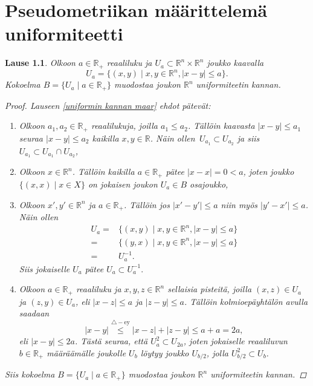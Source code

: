 \documentclass[12pt,a4paper,leqno]{report}
\newcommand{\R}{\mathbb{R}}
\theoremstyle{plain}
\newtheorem{lause}[equation]{Lause}
\theoremstyle{definition}
\theoremstyle{remark}
\begin{document}
\chapter{Pseudometriikan määrittelemä uniformiteetti}\label{luku_pseudo_uniformi}
\begin{lause}
Olkoon $a\in\R_+$ reaaliluku ja $U_a\subset \R^n\times\R^n$ joukko kaavalla
$$U_a=\{ (x,y)\mid x,y\in\R^n,|x-y|\leq a\}.$$
Kokoelma $B=\{U_a\mid a\in\R_+\}$ muodostaa joukon $\R^n$ uniformiteetin kannan.
\begin{proof}
Lauseen \ref{uniformin kannan maar} ehdot pätevät:
\begin{enumerate} [label=(B\arabic*)]
\item %
Olkoon $a_1,a_2\in\R_+$ reaalilukuja, joilla $a_1\leq a_2$. Tällöin kaavasta $|x-y|\leq a_1$ seuraa $|x-y|\leq a_2$ kaikilla $x,y\in\R$. Näin ollen $\, U_{a_1}\subset U_{a_2}$ ja siis $U_{a_1}\subset U_{a_1}\cap U_{a_2}$,
\item%
Olkoon $x\in\R^n$. Tällöin kaikilla $a\in\R_+$ pätee $|x-x|=0< a$, joten joukko $\{(x,x)\mid x\in X\}$ on jokaisen joukon $U_a\in B$ osajoukko,
\item%
Olkoon $x',y'\in\R^n$ ja $a\in\R_+$. Tällöin jos $|x'-y'|\leq a$ niin myös $|y'-x'|\leq a$. Näin ollen 
\begin{align*}
U_a=&\{ (x,y)\mid x,y\in\R^n,|x-y|\leq a\}\\
=&\{ (y,x)\mid x,y\in\R^n,|x-y|\leq a\}\\
=&U_a^{-1}.
\end{align*}
Siis jokaiselle $U_a$ pätee $U_a\subset  U_a^{-1}. $
\item%
Olkoon $a\in\R_+$ reaaliluku ja $x,y,z\in\R^n$ sellaisia pisteitä, joilla $(x,z)\in U_a$ ja $(z,y)\in U_a$, eli $|x-z|\leq a$ ja $|z-y|\leq a$.
Tällöin kolmioepäyhtälön avulla saadaan 
$$|x-y|\stackrel{\triangle-\text{ey} }{\leq} |x-z|+|z-y|\leq a+a=2a,$$ 
eli $|x-y|\leq 2a$. Tästä seuraa, että $ U_a^2\subset U_{2a} $, joten jokaiselle reaaliluvun $b\in\R_+$ määräämälle joukolle $U_b$ löytyy joukko $U_{b/2}$, jolla $U_{b/2}^2\subset U_b$.
\end{enumerate}
Siis kokoelma $B=\{U_a\mid a\in\R_+\}$ muodostaa joukon $\R^n$ uniformiteetin kannan.
\end{proof}
\end{lause}
\end{document}
